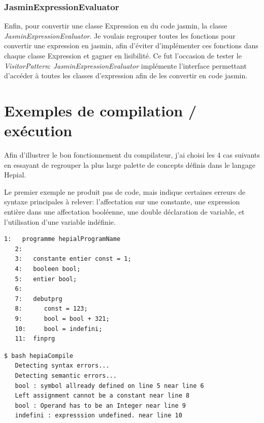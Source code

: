 \documentclass[11pt,a4paper]{article}
\begin{document}
  \subsubsection{JasminExpressionEvaluator}
  
  \par Enfin, pour convertir une classe Expression en du code jasmin, la classe \textit{JasminExpressionEvaluator}. Je voulais regrouper toutes les fonctions pour convertir une expression en jasmin, afin d'éviter d'implémenter ces fonctions dans chaque classe Expression et gagner en lisibilité. Ce fut l'occasion de tester le \textit{VisitorPattern}: \textit{JasminExpressionEvaluator} implémente l'interface permettant d'accéder à toutes les classes d'expression afin de les convertir en code jasmin. 
  
  \section{Exemples de compilation / exécution}
  
  \par Afin d'illustrer le bon fonctionnement du compilateur, j'ai choisi les 4 cas suivants en essayant de regrouper la plus large palette de concepts définis dans le langage Hepial. 
  
  \par Le premier exemple ne produit pas de code, mais indique certaines erreurs de syntaxe principales à relever: l'affectation sur une constante, une expression entière dans une affectation booléenne, une double déclaration de variable, et l'utilisation d'une variable indéfinie. 
  
   \begin{lstlisting}[caption={Code Hepial pour tester les erreurs sémantiques}]
   1:   programme hepialProgramName
   2:   
   3:   constante entier const = 1;
   4:   booleen bool;
   5:   entier bool;
   6:   
   7:   debutprg
   8:      const = 123;
   9:      bool = bool + 321;
   10:     bool = indefini;
   11:  finprg
   \end{lstlisting} 
   
   \begin{lstlisting}[language=bash,caption={Résultat du test des erreurs sémantiques}]
   $ bash hepiaCompile
   Detecting syntax errors...
   Detecting semantic errors...
   bool : symbol allready defined on line 5 near line 6
   Left assignment cannot be a constant near line 8
   bool : Operand has to be an Integer near line 9
   indefini : expresssion undefined. near line 10
   \end{lstlisting} 
   
\end{document}
